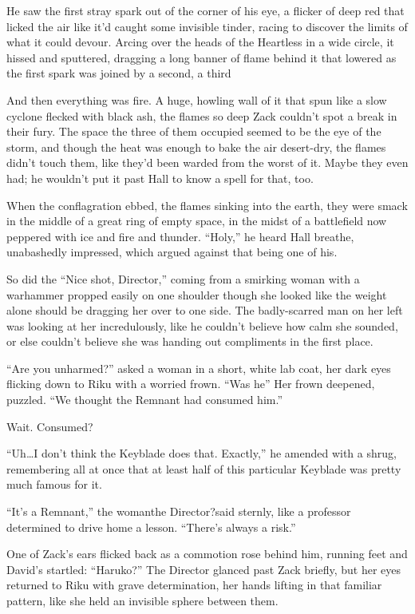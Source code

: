He saw the first stray spark out of the corner of his eye, a flicker of deep red that licked the air like it'd caught some invisible tinder, racing to discover the limits of what it could devour. Arcing over the heads of the Heartless in a wide circle, it hissed and sputtered, dragging a long banner of flame behind it that lowered as the first spark was joined by a second, a third\textemdash 

And then everything was fire. A huge, howling wall of it that spun like a slow cyclone flecked with black ash, the flames so deep Zack couldn't spot a break in their fury. The space the three of them occupied seemed to be the eye of the storm, and though the heat was enough to bake the air desert-dry, the flames didn't touch them, like they'd been warded from the worst of it. Maybe they even had; he wouldn't put it past Hall to know a spell for that, too.

When the conflagration ebbed, the flames sinking into the earth, they were smack in the middle of a great ring of empty space, in the midst of a battlefield now peppered with ice and fire and thunder. ``Holy,'' he heard Hall breathe, unabashedly impressed, which argued against that being one of his.

So did the ``Nice shot, Director,'' coming from a smirking woman with a warhammer propped easily on one shoulder though she looked like the weight alone should be dragging her over to one side. The badly-scarred man on her left was looking at her incredulously, like he couldn't believe how calm she sounded, or else couldn't believe she was handing out compliments in the first place.

``Are you unharmed?'' asked a woman in a short, white lab coat, her dark eyes flicking down to Riku with a worried frown. ``Was he\textemdash'' Her frown deepened, puzzled. ``We thought the Remnant had consumed him.''

Wait. Consumed?

``Uh\ldots I don't think the Keyblade does that. Exactly,'' he amended with a shrug, remembering all at once that at least half of this particular Keyblade was pretty much famous for it.

``It's a Remnant,'' the woman\textemdash the Director?\textemdash said sternly, like a professor determined to drive home a lesson. ``There's always a risk.''

One of Zack's ears flicked back as a commotion rose behind him, running feet and David's startled: ``Haruko?'' The Director glanced past Zack briefly, but her eyes returned to Riku with grave determination, her hands lifting in that familiar pattern, like she held an invisible sphere between them.

